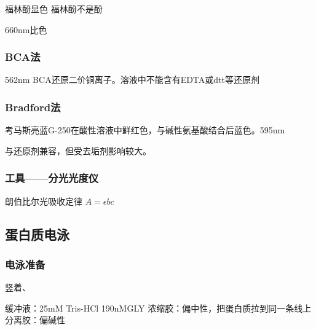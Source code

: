 福林酚显色  福林酚不是酚

660nm比色

\subsubsection{BCA法}

562nm BCA还原二价铜离子。溶液中不能含有EDTA或dtt等还原剂

\subsubsection{Bradford法}

考马斯亮蓝G-250在酸性溶液中鲜红色，与碱性氨基酸结合后蓝色。595nm

与还原剂兼容，但受去垢剂影响较大。

\subsubsection{工具——分光光度仪}

朗伯比尔光吸收定律 $A=\epsilon bc$

\subsection{蛋白质电泳}

\subsubsection{电泳准备}

竖着、

缓冲液：25mM Tris-HCl  190nMGLY
浓缩胶：偏中性，把蛋白质拉到同一条线上
分离胶：偏碱性


